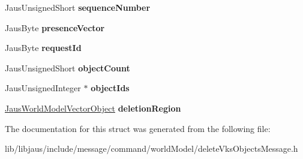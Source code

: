\begin{DoxyCompactItemize}
\item 
\hypertarget{struct_delete_vks_objects_message_struct_adb18b144ca7f1f52067a23b8122e8d8e}{\-Jaus\-Unsigned\-Short {\bfseries sequence\-Number}}\label{struct_delete_vks_objects_message_struct_adb18b144ca7f1f52067a23b8122e8d8e}

\item 
\hypertarget{struct_delete_vks_objects_message_struct_afb9cab479c641aed8f40627e643fabec}{\-Jaus\-Byte {\bfseries presence\-Vector}}\label{struct_delete_vks_objects_message_struct_afb9cab479c641aed8f40627e643fabec}

\item 
\hypertarget{struct_delete_vks_objects_message_struct_a059d4c83b730f8646fed2572975b7359}{\-Jaus\-Byte {\bfseries request\-Id}}\label{struct_delete_vks_objects_message_struct_a059d4c83b730f8646fed2572975b7359}

\item 
\hypertarget{struct_delete_vks_objects_message_struct_a6e834c521bd912c6e5dfa26d39a4ebe7}{\-Jaus\-Unsigned\-Short {\bfseries object\-Count}}\label{struct_delete_vks_objects_message_struct_a6e834c521bd912c6e5dfa26d39a4ebe7}

\item 
\hypertarget{struct_delete_vks_objects_message_struct_a8329429347a11e4b38a624155874cba6}{\-Jaus\-Unsigned\-Integer $\ast$ {\bfseries object\-Ids}}\label{struct_delete_vks_objects_message_struct_a8329429347a11e4b38a624155874cba6}

\item 
\hypertarget{struct_delete_vks_objects_message_struct_a9ef9271db4d9cded94b090e16b1c2db0}{\hyperlink{struct_jaus_world_model_vector_object_struct}{\-Jaus\-World\-Model\-Vector\-Object} {\bfseries deletion\-Region}}\label{struct_delete_vks_objects_message_struct_a9ef9271db4d9cded94b090e16b1c2db0}

\end{DoxyCompactItemize}


\-The documentation for this struct was generated from the following file\-:\begin{DoxyCompactItemize}
\item 
lib/libjaus/include/message/command/world\-Model/delete\-Vks\-Objects\-Message.\-h\end{DoxyCompactItemize}
